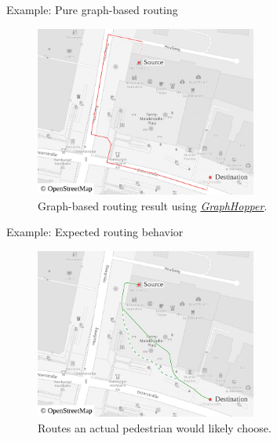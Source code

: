 \documentclass[xcolor={x11names}]{beamer}
\newenvironment{figcenter}
{%
	\parskip=0pt%
	\par%
	\nopagebreak%
	\centering%
}%
{%
	\par%
	\noindent%
	\ignorespacesafterend%
}
\begin{document}
		\begin{frame}{Example: Pure graph-based routing}
			\begin{figure}[t]
				\begin{figcenter}
					\includegraphics[width=0.65\textwidth]{images/qgis-routing-osterstrasse_routing.pdf}
				\end{figcenter}
				\caption{Graph-based routing result using \href{https://www.osm.org/directions?engine=graphhopper\_foot\&route=53.57657,9.95210;53.57601,9.95268}{\emph{GraphHopper}}.}
			\end{figure}
		\end{frame}
		
		\begin{frame}{Example: Expected routing behavior}
			\begin{figure}[t]
				\begin{figcenter}
					\includegraphics[width=0.65\textwidth]{images/qgis-routing-osterstrasse_expected.pdf}
				\end{figcenter}
				\caption{Routes an actual pedestrian would likely choose.}
			\end{figure}
		\end{frame}
		
		
\end{document}
